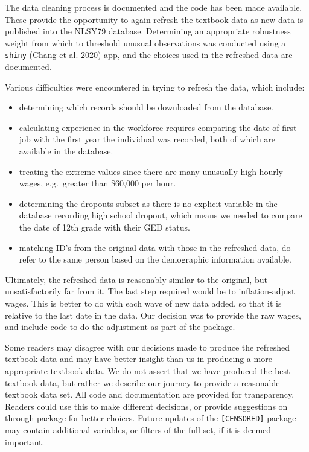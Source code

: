 \documentclass{article}
\providecommand{\tightlist}{%
  \setlength{\itemsep}{0pt}\setlength{\parskip}{0pt}}
\begin{document}
The data cleaning process is documented and the code has been made available. These provide the opportunity to again refresh the textbook data as new data is published into the NLSY79 database.
Determining an appropriate robustness weight from which to threshold unusual observations was conducted using a \texttt{shiny} (Chang et al. 2020) app, and the choices used in the refreshed data are documented.

Various difficulties were encountered in trying to refresh the data, which include:

\begin{itemize}
\tightlist
\item
  determining which records should be downloaded from the database.
\item
  calculating experience in the workforce requires comparing the date of first job with the first year the individual was recorded, both of which are available in the database.
\item
  treating the extreme values since there are many unusually high hourly wages, e.g.~greater than \$60,000 per hour.
\item
  determining the dropouts subset as there is no explicit variable in the database recording high school dropout, which means we needed to compare the date of 12th grade with their GED status.
\item
  matching ID's from the original data with those in the refreshed data, do refer to the same person based on the demographic information available.
\end{itemize}

Ultimately, the refreshed data is reasonably similar to the original, but unsatisfactorily far from it. The last step required would be to inflation-adjust wages. This is better to do with each wave of new data added, so that it is relative to the last date in the data. Our decision was to provide the raw wages, and include code to do the adjustment as part of the package.

Some readers may disagree with our decisions made to produce the refreshed textbook data and may have better insight than us in producing a more appropriate textbook data. We do not assert that we have produced the best textbook data, but rather we describe our journey to provide a reasonable textbook data set. All code and documentation are provided for transparency. Readers could use this to make different decisions, or provide suggestions on through package for better choices. Future updates of the \texttt{[CENSORED]} package may contain additional variables, or filters of the full set, if it is deemed important.
\end{document}
